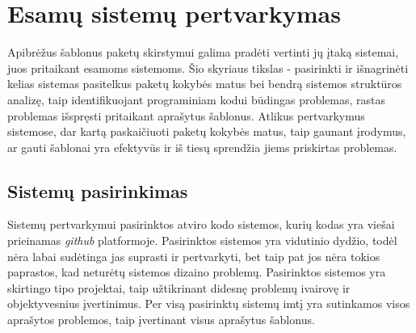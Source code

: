 \section{Esamų sistemų pertvarkymas}
Apibrėžus šablonus paketų skirstymui galima pradėti vertinti jų įtaką sistemai, juos pritaikant esamoms sistemoms.
Šio skyriaus tikslas - pasirinkti ir išnagrinėti kelias sistemas pasitelkus paketų kokybės matus bei bendrą sistemos struktūros analizę,
taip identifikuojant programiniam kodui būdingas problemas, rastas problemas išspręsti pritaikant aprašytus šablonus.
Atlikus pertvarkymus sistemose, dar kartą paskaičiuoti paketų kokybės matus,
taip gaunant įrodymus, ar gauti šablonai yra efektyvūs ir iš tiesų sprendžia
jiems priskirtas problemas.


\subsection{Sistemų pasirinkimas}
Sistemų pertvarkymui pasirinktos atviro kodo sistemos, kurių kodas yra viešai prieinamas \textit{github} platformoje.
Pasirinktos sistemos yra vidutinio dydžio, todėl nėra labai sudėtinga jas suprasti ir pertvarkyti, bet taip pat jos nėra
tokios paprastos, kad neturėtų sistemos dizaino problemų.
Pasirinktos sistemos yra skirtingo tipo projektai, taip užtikrinant didesnę problemų ivairovę ir objektyvesnius įvertinimus.
Per visą pasirinktų sistemų imtį yra sutinkamos visos aprašytos problemos, taip įvertinant visus aprašytus šablonus.

